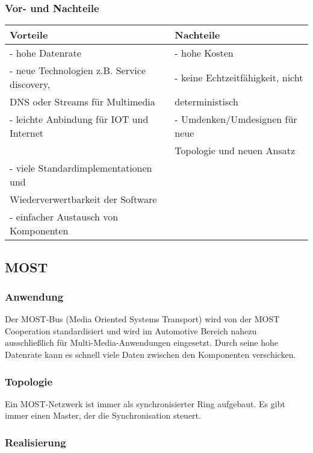 \subsubsection{Vor- und Nachteile}
\begin{tabular}{l | l}
	Vorteile & Nachteile\\
	\hline - hohe Datenrate & - hohe Kosten\\
	\hline - neue Technologien z.B. Service discovery,  & - keine Echtzeitfähigkeit, nicht\\
	DNS oder Streams für Multimedia & deterministisch\\
	\hline - leichte Anbindung für IOT und Internet & - Umdenken/Umdesignen für neue \\
	& Topologie und neuen Ansatz\\
	\hline - viele Standardimplementationen und&\\
	Wiederverwertbarkeit der Software&\\
	\hline - einfacher Austausch von Komponenten &\\
	

\end{tabular}

\subsection{MOST}		
\subsubsection{Anwendung}
Der MOST-Bus (Media Oriented Systems Transport) wird von der MOST Cooperation standardisiert und wird im Automotive Bereich nahezu ausschließlich für Multi-Media-Anwendungen eingesetzt. Durch seine hohe Datenrate kann es schnell viele Daten zwischen den Komponenten verschicken.


\subsubsection{Topologie}
Ein MOST-Netzwerk ist immer als synchronisierter Ring aufgebaut. Es gibt immer einen Master, der die Synchronisation steuert.


\subsubsection{Realisierung}
